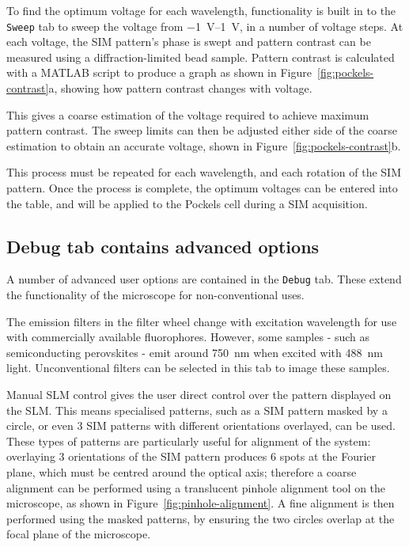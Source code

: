 To find the optimum voltage for each wavelength, functionality is built in to the \texttt{Sweep} tab to sweep the voltage from \SIrange{-1}{1}{\volt}, in a number of voltage steps. 
At each voltage, the SIM pattern's phase is swept and pattern contrast can be measured using a diffraction-limited bead sample. 
Pattern contrast is calculated with a MATLAB script to produce a graph as shown in Figure~\ref{fig:pockels-contrast}a, showing how pattern contrast changes with voltage. 

This gives a coarse estimation of the voltage required to achieve maximum pattern contrast. 
The sweep limits can then be adjusted either side of the coarse estimation to obtain an accurate voltage, shown in Figure~\ref{fig:pockels-contrast}b. 

This process must be repeated for each wavelength, and each rotation of the SIM pattern. 
Once the process is complete, the optimum voltages can be entered into the table, and will be applied to the Pockels cell during a SIM acquisition. 


\subsection{Debug tab contains advanced options}
A number of advanced user options are contained in the \texttt{Debug} tab. 
These extend the functionality of the microscope for non-conventional uses. 

The emission filters in the filter wheel change with excitation wavelength for use with commercially available fluorophores.
However, some samples - such as semiconducting perovskites - emit around \SI{750}{\nano\metre} when excited with \SI{488}{\nano\metre} light. 
Unconventional filters can be selected in this tab to image these samples. 

Manual SLM control gives the user direct control over the pattern displayed on the SLM. 
This means specialised patterns, such as a SIM pattern masked by a circle, or even 3 SIM patterns with different orientations overlayed, can be used.
These types of patterns are particularly useful for alignment of the system: overlaying 3 orientations of the SIM pattern produces 6 spots at the Fourier plane, which must be centred around the optical axis; therefore a coarse alignment can be performed using a translucent pinhole alignment tool on the microscope, as shown in Figure~\ref{fig:pinhole-alignment}. 
A fine alignment is then performed using the masked patterns, by ensuring the two circles overlap at the focal plane of the microscope. 

